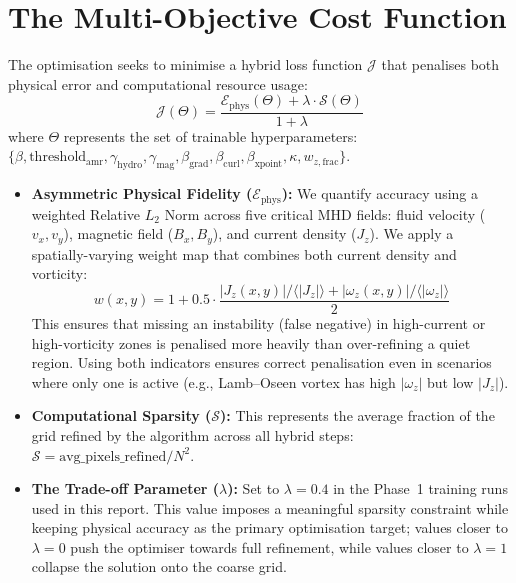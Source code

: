 \documentclass[12pt, a4paper, oneside]{report}
\begin{document}
\section{The Multi-Objective Cost Function}
The optimisation seeks to minimise a hybrid loss function $\mathcal{J}$ that penalises both physical error and computational resource usage:
\begin{equation}
    \mathcal{J}(\Theta) = \frac{\mathcal{E}_{\text{phys}}(\Theta) + \lambda \cdot \mathcal{S}(\Theta)}{1 + \lambda}
    \label{eq:combined-score}
\end{equation}
where $\Theta$ represents the set of trainable hyperparameters:\\ $\{\beta, \text{threshold}_{\text{amr}}, \gamma_{\text{hydro}}, \gamma_{\text{mag}}, \beta_{\text{grad}}, \beta_{\text{curl}}, \beta_{\text{xpoint}}, \kappa, w_{z,\text{frac}}\}$.

\begin{itemize}
    \item \textbf{Asymmetric Physical Fidelity ($\mathcal{E}_{\text{phys}}$):} We quantify accuracy using a weighted Relative $L_2$ Norm across five critical MHD fields: fluid velocity ($v_x, v_y$), magnetic field ($B_x, B_y$), and current density ($J_z$). We apply a spatially-varying weight map that combines both current density and vorticity:
    \begin{equation}
        w(x,y) = 1 + 0.5 \cdot \frac{|J_z(x,y)| / \langle|J_z|\rangle + |\omega_z(x,y)| / \langle|\omega_z|\rangle}{2}
    \end{equation}
    This ensures that missing an instability (false negative) in high-current or high-vorticity zones is penalised more heavily than over-refining a quiet region. Using both indicators ensures correct penalisation even in scenarios where only one is active (e.g., Lamb--Oseen vortex has high $|\omega_z|$ but low $|J_z|$).

    \item \textbf{Computational Sparsity ($\mathcal{S}$):} This represents the average fraction of the grid refined by the algorithm across all hybrid steps: $\mathcal{S} = \text{avg\_pixels\_refined} / N^2$.

    \item \textbf{The Trade-off Parameter ($\lambda$):} Set to $\lambda = 0.4$ in the Phase~1 training runs used in this report. This value imposes a meaningful sparsity constraint while keeping physical accuracy as the primary optimisation target; values closer to $\lambda = 0$ push the optimiser towards full refinement, while values closer to $\lambda = 1$ collapse the solution onto the coarse grid.
\end{itemize}
\end{document}
